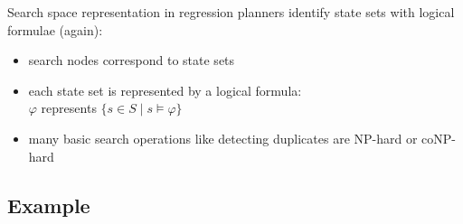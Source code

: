 \documentclass{gkibeamer}
\begin{document}
\begin{frame}{Search space representation in regression planners}
  identify state sets with \alert{logical formulae} (again):
  \begin{itemize}
  \item \alert{search nodes correspond to state sets}
  \item each state set is represented by a \alert{logical formula}: \\
    $\varphi$ represents $\{s \in S \mid s \models \varphi\}$
  \item many basic search operations like detecting duplicates
    are NP-hard or coNP-hard
  \end{itemize}
\end{frame}

\subsection{Example}
\end{document}
